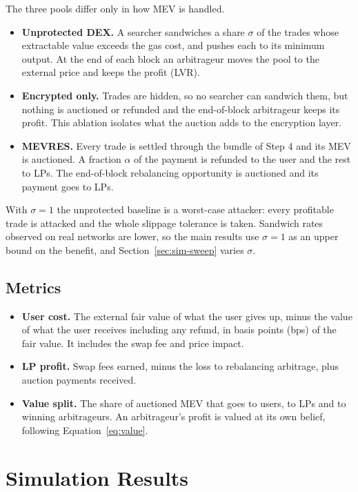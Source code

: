 The three pools differ only in how MEV is handled.
\begin{itemize}
    \item \textbf{Unprotected DEX.} A searcher sandwiches a share $\sigma$ of the trades whose extractable value exceeds the gas cost, and pushes each to its minimum output. At the end of each block an arbitrageur moves the pool to the external price and keeps the profit (LVR).
    \item \textbf{Encrypted only.} Trades are hidden, so no searcher can sandwich them, but nothing is auctioned or refunded and the end-of-block arbitrageur keeps its profit. This ablation isolates what the auction adds to the encryption layer.
    \item \textbf{MEVRES.} Every trade is settled through the bundle of Step 4 and its MEV is auctioned. A fraction $\alpha$ of the payment is refunded to the user and the rest to LPs. The end-of-block rebalancing opportunity is auctioned and its payment goes to LPs.
\end{itemize}

With $\sigma=1$ the unprotected baseline is a worst-case attacker: every profitable trade is attacked and the whole slippage tolerance is taken. Sandwich rates observed on real networks are lower, so the main results use $\sigma=1$ as an upper bound on the benefit, and Section~\ref{sec:sim-sweep} varies $\sigma$.

\subsection{Metrics}

\begin{itemize}
    \item \textbf{User cost.} The external fair value of what the user gives up, minus the value of what the user receives including any refund, in basis points (bps) of the fair value. It includes the swap fee and price impact.
    \item \textbf{LP profit.} Swap fees earned, minus the loss to rebalancing arbitrage, plus auction payments received.
    \item \textbf{Value split.} The share of auctioned MEV that goes to users, to LPs and to winning arbitrageurs. An arbitrageur's profit is valued at its own belief, following Equation~\ref{eq:value}.
\end{itemize}

\section{Simulation Results}
\label{sec:sim-results}

